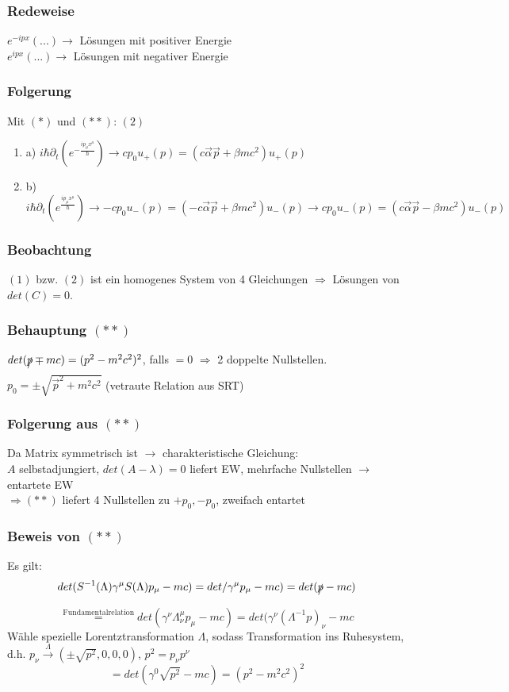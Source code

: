 \documentclass[twoside,a4paper]{scrartcl}
\renewcommand{\1}{\mathds{1}}
\newcommand{\Ra}{\Rightarrow}
\newcommand{\ra}{\rightarrow}
\renewcommand{\l}{\lambda}
\renewcommand{\L}{\Lambda}
\begin{document}
\subsubsection*{Redeweise}
$e^{-ipx}(...) \ra$ Lösungen mit positiver Energie\\
$e^{ipx}(...) \ra$ Lösungen mit negativer Energie\\
\subsubsection*{Folgerung}
Mit $(*)$ und $(**)$: $(2)$ 
\begin{enumerate}
\item a) $i\hbar \partial_t(e^{-\frac{ip_\mu x^\mu}{\hbar}}) \ra cp_0 u_+(p)=(c \vec \alpha \vec p +\beta mc^2)u_+(p)$
\item b) $i\hbar \partial_t(e^{\frac{ip_\mu x^\mu}{\hbar}}) \ra -cp_0 u_-(p)=(-c \vec \alpha \vec p +\beta mc^2)u_-(p) \ra cp_0 u_-(p)=(c \vec \alpha \vec p -\beta mc^2)u_-(p)$
\end{enumerate}
\subsubsection*{Beobachtung}
$(1)$ bzw. $(2)$ ist ein homogenes System von 4 Gleichungen $\Ra$ Lösungen von $det(C)=0$.
\subsubsection*{Behauptung $(**)$}
$det(\xout{p} \mp mc)=(p^2- m^2c^2)^2$, falls $=0$ $\Ra$ 2 doppelte Nullstellen.\\
$p_0=\pm\sqrt{\vec p^2+m^2c^2}$ (vetraute Relation aus SRT)
\subsubsection*{Folgerung aus $(**)$}
Da Matrix symmetrisch ist $\ra$ charakteristische Gleichung:\\
$A$ selbstadjungiert, $det(A-\l)=0$ liefert EW, mehrfache Nullstellen $\ra$ entartete EW\\
$\Ra (**)$ liefert 4 Nullstellen zu $+p_0,-p_0$, zweifach entartet
\subsubsection*{Beweis von $(**)$}
Es gilt:
$$det(S^{-1}(\L)\gamma^\mu S(\L) p_\mu-mc)=det/\gamma^\mu p_\mu -mc)=det(\xout{p} -mc)$$
$$\stackrel{\mathrm{Fundamentalrelation}}{=} det(\gamma^\nu \L_\nu^\mu p_\mu-mc)=det(\gamma^\nu(\L^{-1}p)_\nu-mc$$
Wähle spezielle Lorentztransformation $\L$, sodass Transformation ins Ruhesystem, d.h. $p_\nu \stackrel{\L}{\ra} (\pm \sqrt{p^2},0,0,0)$, $p^2=p_\nu p^\nu$
$$=det(\gamma^0\sqrt{p^2}-mc)=(p^2-m^2c^2)^2$$
\end{document}
